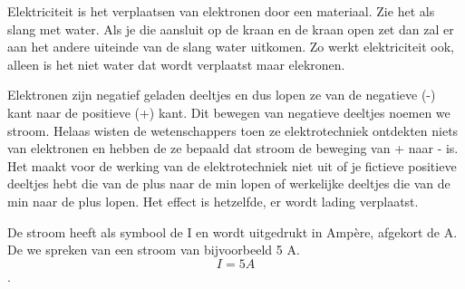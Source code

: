 Elektriciteit is het verplaatsen van elektronen door een materiaal. Zie het als slang met water. Als je die aansluit op de kraan en de kraan open zet dan zal er aan het andere uiteinde van de slang water uitkomen. Zo werkt elektriciteit ook, alleen is het niet water dat wordt verplaatst maar elekronen.

Elektronen zijn negatief geladen deeltjes en dus lopen ze van de negatieve (-) kant naar de positieve (+) kant. Dit bewegen van negatieve deeltjes noemen we stroom. Helaas wisten de wetenschappers toen ze elektrotechniek ontdekten niets van elektronen en hebben de ze bepaald dat stroom de beweging van + naar - is. Het maakt voor de werking van de elektrotechniek niet uit of je fictieve positieve deeltjes hebt die van de plus naar de min lopen of werkelijke deeltjes die van de min naar de plus lopen. Het effect is hetzelfde, er wordt lading verplaatst.

De stroom heeft als symbool de I en wordt uitgedrukt in Amp\`ere, afgekort de A. De we spreken van een stroom van bijvoorbeeld 5 A. \[ I = 5 A \].
